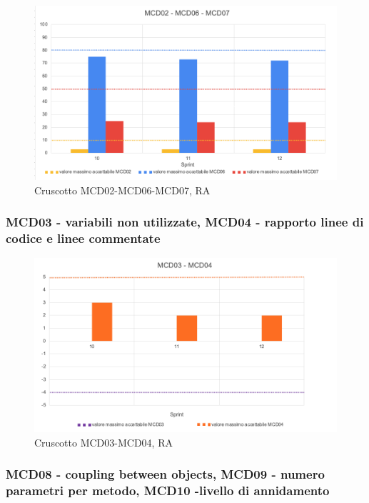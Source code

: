 \begin{figure}[H] 
    \centering
    \includegraphics[scale = 0.8]{immagini/ImmRA/MCD020607.png}
    \caption{Cruscotto MCD02-MCD06-MCD07, RA}
\end{figure}

\subsubsection*{MCD03 - variabili non utilizzate, MCD04 - rapporto linee di codice e linee commentate }

\begin{figure}[H] 
    \centering
    \includegraphics[scale = 0.8]{immagini/ImmRA/MCD0304.png}
    \caption{Cruscotto MCD03-MCD04, RA}
\end{figure}

\subsubsection*{MCD08 - coupling between objects, MCD09 - numero parametri per metodo, MCD10 -livello di annidamento }

